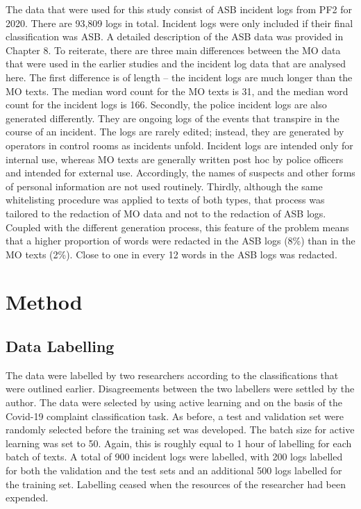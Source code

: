 The data that were used for this study consist of ASB incident logs from PF2 for 2020. There are 93,809 logs in total. Incident logs were only included if their final classification was ASB. A detailed description of the ASB data was provided in Chapter 8. To reiterate, there are three main differences between the MO data that were used in the earlier studies and the incident log data that are analysed here. The first difference is of length – the incident logs are much longer than the MO texts. The median word count for the MO texts is 31, and the median word count for the incident logs is 166. Secondly, the police incident logs are also generated differently. They are ongoing logs of the events that transpire in the course of an incident. The logs are rarely edited; instead, they are generated by operators in control rooms as incidents unfold. Incident logs are intended only for internal use, whereas MO texts are generally written post hoc by police officers and intended for external use. Accordingly, the names of suspects and other forms of personal information are not used routinely. Thirdly, although the same whitelisting procedure was applied to texts of both types, that process was tailored to the redaction of MO data and not to the redaction of ASB logs. Coupled with the different generation process, this feature of the problem means that a higher proportion of words were redacted in the ASB logs (8\%) than in the MO texts (2\%). Close to one in every 12 words in the ASB logs was redacted.

\section{Method}


\subsection{Data Labelling} The data were labelled by two researchers according to the classifications that were outlined earlier. Disagreements between the two labellers were settled by the author. The data were selected by using active learning and on the basis of the Covid-19 complaint classification task. As before, a test and validation set were randomly selected before the training set was developed. The batch size for active learning was set to 50. Again, this is roughly equal to 1 hour of labelling for each batch of texts. A total of 900 incident logs were labelled, with 200 logs labelled for both the validation and the test sets and an additional 500 logs labelled for the training set. Labelling ceased when the resources of the researcher had been expended.

